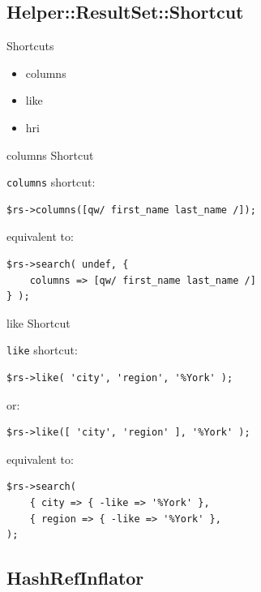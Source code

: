 \subsection{Helper::ResultSet::Shortcut}




\begin{frame}{Shortcuts}
\begin{itemize}
\item columns
\item like
\item hri
\end{itemize}
\end{frame}

\begin{frame}[fragile]{columns Shortcut}

\verb|columns| shortcut:

\begin{lstlisting}
$rs->columns([qw/ first_name last_name /]);
\end{lstlisting}

equivalent to:

\begin{lstlisting}
$rs->search( undef, { 
    columns => [qw/ first_name last_name /] 
} );
\end{lstlisting}
\end{frame}

\begin{frame}[fragile]{like Shortcut}

\verb|like| shortcut:

\begin{lstlisting}
$rs->like( 'city', 'region', '%York' );
\end{lstlisting}

or:

\begin{lstlisting}
$rs->like([ 'city', 'region' ], '%York' );
\end{lstlisting}

equivalent to:

\begin{lstlisting}
$rs->search(
    { city => { -like => '%York' },
    { region => { -like => '%York' },
);
\end{lstlisting}
\end{frame}

\subsection{HashRefInflator}

